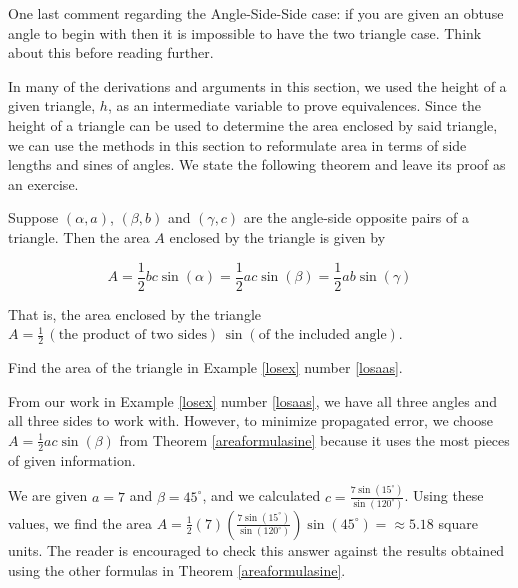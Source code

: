 \documentclass{ximera}
\begin{document}
One last comment regarding the Angle-Side-Side case:  if you are given an obtuse angle to begin with then it is impossible to have the two triangle case.  Think about this before reading further.

 

In many of the derivations and arguments in this section, we used the height of a given triangle, $h$, as an intermediate variable to prove equivalences.  Since the height of a triangle can be used to determine the area enclosed by said triangle, we can use the methods in this section to reformulate area in terms of side lengths and sines of angles. We state the following theorem and leave its proof as an exercise.

 


\begin{theorem} \label{areaformulasine}  Suppose $(\alpha, a)$, $(\beta, b)$ and $(\gamma, c)$ are the angle-side opposite pairs of a triangle.  Then the area $A$ enclosed by the triangle is given by

\[A = \frac{1}{2}bc\sin(\alpha) =  \frac{1}{2}ac\sin(\beta) =  \frac{1}{2}ab\sin(\gamma)\]

 

That is, the area enclosed by the triangle $A = \frac{1}{2} \, (\text{the product of two sides}) \, \sin(\text{of the included angle})$.

\end{theorem}


 

\begin{example} \label{areaformulasineex}  Find the area of the triangle in Example \ref{losex} number \ref{losaas}.

 

\begin{explanation}

From our work in  Example \ref{losex} number \ref{losaas}, we have all three angles and all three sides to work with.  However, to minimize propagated error, we choose $A = \frac{1}{2} ac \sin(\beta)$ from Theorem \ref{areaformulasine} because it uses the most pieces of given information.  

 

We are given  $a = 7$ and $\beta = 45^{\circ}$, and we calculated $c = \frac{7\sin\left(15^{\circ}\right)}{\sin\left(120^{\circ}\right)}$.   Using these values, we find the area  $A =  \frac{1}{2}(7)\left(\frac{7\sin\left(15^{\circ}\right)}{\sin\left(120^{\circ}\right)} \right) \sin\left(45^{\circ}\right) =  \approx 5.18$ square units. The reader is encouraged to check this answer against the results obtained using the other formulas in Theorem \ref{areaformulasine}. 
\end{explanation}
\end{example}
\end{document}
